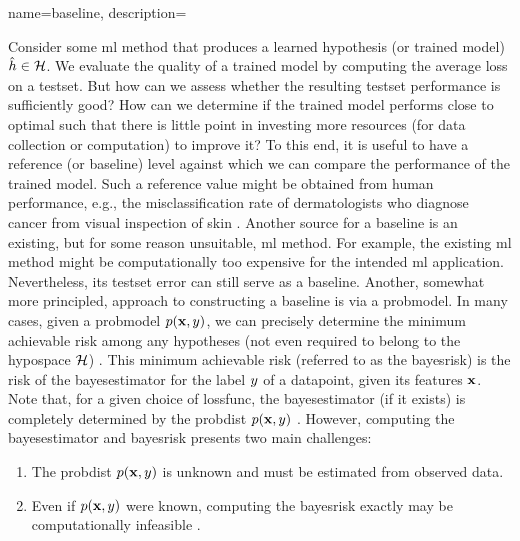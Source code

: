 {name={baseline},
    description={Consider some \gls{ml} method that produces a learned 
    	\gls{hypothesis} (or trained \gls{model}) $\hat{h} \in \mathcal{H}$. We evaluate the quality of a trained \gls{model} 
    	by computing the average \gls{loss} on a \gls{testset}. But how can we assess 
    	whether the resulting \gls{testset} performance is sufficiently good? How can we 
    	determine if the trained \gls{model} performs close to optimal such that there is little point 
   	in investing more resources (for \gls{data} collection or computation) to improve it? 
    	To this end, it is useful to have a reference (or baseline) level against which 
    	we can compare the performance of the trained \gls{model}. Such a reference value 
    	might be obtained from human performance, e.g., the misclassification rate of dermatologists 
    	who diagnose cancer from visual inspection of skin \cite{SkinHumanAI}. Another source for a baseline is an existing, 
    	but for some reason unsuitable, \gls{ml} method. For example, the existing \gls{ml} method 
    	might be computationally too expensive for the intended \gls{ml} application. 
    	Nevertheless, its \gls{testset} error can still serve as a baseline. Another, somewhat more principled, 
    	approach to constructing a baseline is via a \gls{probmodel}. In many cases, given a \gls{probmodel} $p({\bf x},y)$,  
    	we can precisely determine the \gls{minimum} achievable \gls{risk} among any hypotheses
    	(not even required to belong to the \gls{hypospace} $\mathcal{H}$) \cite{LC}. 
    	This \gls{minimum} achievable \gls{risk} (referred to as the \gls{bayesrisk}) is the \gls{risk} 
    	of the \gls{bayesestimator} for the \gls{label} $y$ of a \gls{datapoint}, given
    	its \glspl{feature} ${\bf x}$. Note that, for a given choice of \gls{lossfunc}, the 
    	\gls{bayesestimator} (if it exists) is completely determined by the \gls{probdist} $p({\bf x},y)$ \cite[Ch. 4]{LC}. 
    	However, computing the \gls{bayesestimator} and \gls{bayesrisk} presents two 
    	main challenges:
    \begin{enumerate}[label=\arabic*)]
    	\item The \gls{probdist} $p({\bf x},y)$ is unknown and must be estimated from observed \gls{data}.
    	\item Even if $p({\bf x},y)$ were known, computing the \gls{bayesrisk} exactly may be computationally infeasible \cite{cooper1990computational}. 

\end{enumerate}}}

